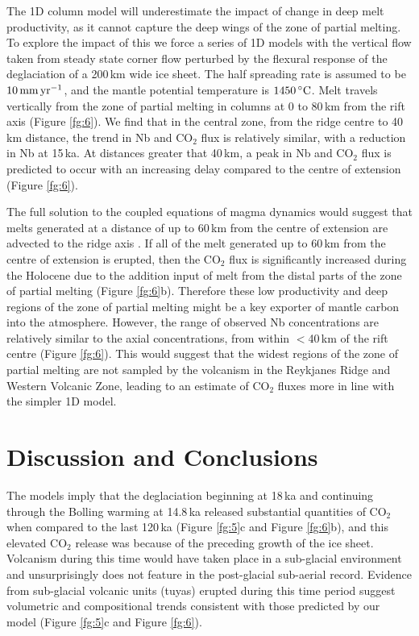 \documentclass[draft,linenumbers]{agujournal2018}
\begin{document}
The 1D column model will underestimate the impact of change in deep melt productivity, as it cannot capture the deep wings of the zone of partial melting. To explore the impact of this we force a series of 1D models with the vertical flow taken from steady state corner flow perturbed by the flexural response of the deglaciation of a 200\,km wide ice sheet. The half spreading rate is assumed to be $10\rm\,mm\,yr^{-1}$, and the mantle potential temperature is $1450\rm\,^{\circ}C$. Melt travels vertically from the zone of partial melting in columns at 0 to 80\,km from the rift axis (Figure \ref{fg:6}). We find that in the central zone, from the ridge centre to 40\,km distance, the trend in Nb and CO$_{2}$ flux is relatively similar, with a reduction in Nb at 15\,ka. At distances greater that 40\,km, a peak in Nb and CO$_{2}$ flux is predicted to occur with an increasing delay compared to the centre of extension (Figure \ref{fg:6}). 

The full solution to the coupled equations of magma dynamics would suggest that melts generated at a distance of up to 60\,km from the centre of extension are advected to the ridge axis \citep{katz-2008}. If all of the melt generated up to 60\,km from the centre of extension is erupted, then the CO$_{2}$ flux is significantly increased during the Holocene due to the addition input of melt from the distal parts of the zone of partial melting (Figure \ref{fg:6}b). Therefore these low productivity and deep regions of the zone of partial melting might be a key exporter of mantle carbon into the atmosphere. However, the range of observed Nb concentrations are relatively similar to the axial concentrations, from within $<$40\,km of the rift centre (Figure \ref{fg:6}). This would suggest that the widest regions of the zone of partial melting are not sampled by the volcanism in the Reykjanes Ridge and Western Volcanic Zone, leading to an estimate of CO$_{2}$ fluxes more in line with the simpler 1D model.

\section{Discussion and Conclusions}

The models imply that the deglaciation beginning at 18\,ka and continuing through the B{\/o}lling warming at 14.8\,ka released substantial quantities of CO$_{2}$ when compared to the last 120\,ka (Figure \ref{fg:5}c and Figure \ref{fg:6}b), and this elevated CO$_{2}$ release was because of the preceding growth of the ice sheet. Volcanism during this time would have taken place in a sub-glacial environment and unsurprisingly does not feature in the post-glacial sub-aerial record. Evidence from sub-glacial volcanic units (tuyas) erupted during this time period \citep{hartley-etal-2016} suggest volumetric and compositional trends consistent with those predicted by our model (Figure \ref{fg:5}c and Figure \ref{fg:6}).
\end{document}
